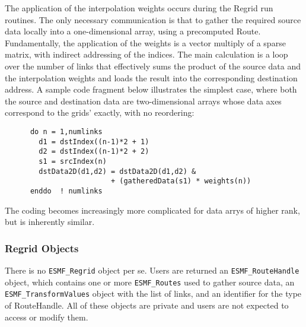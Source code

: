 The application of the interpolation weights occurs during the Regrid run
routines.  The only necessary communication is that to gather the required source
data locally into a one-dimensional array, using a precomputed Route.
Fundamentally, the application of the weights is a vector multiply of a sparse
matrix, with indirect addressing of the indices.  The main calculation is a loop
over the number of links that effectively sums the product of the source data and
the interpolation weights and loads the result into the corresponding destination
address.  A sample code fragment below illustrates the simplest case, where both
the source and destination data are two-dimensional arrays whose data axes 
correspond to the grids' exactly, with no reordering:

\begin{verbatim}
      do n = 1,numlinks     
        d1 = dstIndex((n-1)*2 + 1)
        d2 = dstIndex((n-1)*2 + 2) 
        s1 = srcIndex(n)           
        dstData2D(d1,d2) = dstData2D(d1,d2) &
                         + (gatheredData(s1) * weights(n))
      enddo  ! numlinks
\end{verbatim}

The coding becomes increasingly more complicated for data arrys of higher rank,
but is inherently similar.



\subsubsection{Regrid Objects}

There is no {\tt ESMF\_Regrid} object per se.  Users are returned an
{\tt ESMF_RouteHandle} object, which contains one or more {\tt ESMF\_Routes}
used to gather source data, an {\tt ESMF\_TransformValues} object with the
list of links, and an identifier for the type of RouteHandle.  All of these
objects are private and users are not expected to access or modify them.
